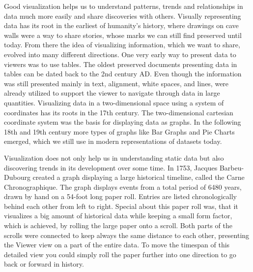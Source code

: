 Good visualization helps us to understand patterns, trends and relationships in
data much more easily and share discoveries with others. Visually representing
data has its root in the earliest of humanity's history, where drawings on
cave walls were a way to share stories, whose marks we can still find
preserved until today. From there the idea of visualizing information, which we
want to share, evolved into many different directions. One very early way to
present data to viewers was to use tables. The oldest preserved documents
presenting data in tables can be dated back to the 2nd century AD. Even though
the information was still presented mainly in text, alignment, white spaces, and
lines, were already utilized to support the viewer to navigate through data in
large quantities.  Visualizing data in a two-dimensional space using a system of
coordinates has its roots in the 17th century. The two-dimensional cartesian
coordinate system was the basis for displaying data as graphs. In the following
18th and 19th century more types of graphs like Bar Graphs and Pie Charts
emerged, which we still use in modern representations of datasets today.
\cite{DataVisHistory}

Visualization does not only help us in understanding static data but also
discovering trends in its development over some time. In 1753, Jacques
Barbeu-Dubourg created a graph displaying a large historical timeline, called
the Carne Chronographique. The graph displays events from a total period of
6480 years, drawn by hand on a 54-foot long paper roll. Entries are listed
chronologically behind each other from left to right. Special about this paper
roll was, that it visualizes a big amount of historical data while keeping a
small form factor, which is achieved, by rolling the large paper onto a scroll.
Both parts of the scrolls were connected to keep always the same distance
to each other, presenting the Viewer view on a part of the entire data. To move
the timespan of this detailed view you could simply roll the paper further into
one direction to go back or forward in history.
\cite{DataVisHistPresentation}

